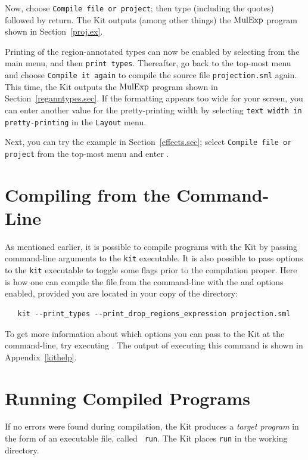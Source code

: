\documentclass[12pt]{book}
\begin{document}
Now, choose \texttt{Compile file or project}; then type
 (including the quotes) followed by return.
The Kit outputs (among other things) the $\hbox{\rm MulExp}$ program shown in
Section~\ref{proj.ex}. 

Printing of the region-annotated types can now be enabled by selecting
 from the main menu, and then \texttt{print types}.
Thereafter, go back to the top-most menu and choose \texttt{Compile it
  again} to compile the source file {\tt projection.sml} again. This
time, the Kit outputs the $\hbox{\rm MulExp}$ program shown in
Section~\ref{reganntypes.sec}. If the formatting appears too wide for
your screen, you can enter another value for the pretty-printing width
by selecting \texttt{text width in pretty-printing} in the
\texttt{Layout} menu.

Next, you can try the example in Section~\ref{effects.sec}; select
\texttt{Compile file or project} from the top-most menu and enter
.

\section{Compiling from the Command-Line}
As mentioned earlier, it is possible to compile programs with the Kit
by passing command-line arguments to the {\tt kit} executable. It is
also possible to pass 
%
%
options to the {\tt kit} executable to toggle some flags prior to the
compilation proper. Here is how one can compile the
 file from the command-line with the
 and 
options enabled, provided you are located in your copy of the
 directory:
\begin{verbatim}
   kit --print_types --print_drop_regions_expression projection.sml
\end{verbatim}
To get more information about which options you can pass to the Kit at
the command-line, try executing . The output of
executing this command is shown in Appendix~\ref{kithelp}.

\section{Running Compiled Programs}
If no errors were found during compilation, the Kit produces a
%
{\em target program} in the form of an executable file, called {\tt
  run}. The Kit places {\tt run} in the working directory.
\end{document}
